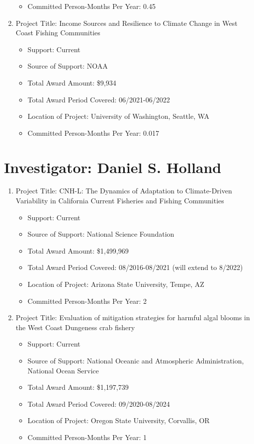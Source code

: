 \documentclass[12pt]{elsarticle}
\begin{document}
\begin{enumerate}
\begin{itemize}
\item Committed Person-Months Per Year: 0.45
\end{itemize}
\item Project Title: Income Sources and Resilience to Climate Change in West Coast Fishing Communities
\begin{itemize}
\item Support: Current
\item Source of Support: NOAA
\item Total Award Amount: \$9,934
\item Total Award Period Covered: 06/2021-06/2022
\item Location of Project: University of Washington, Seattle, WA
\item Committed Person-Months Per Year: 0.017
\end{itemize}
\end{enumerate}


\section*{Investigator: Daniel S. Holland}

\begin{enumerate}
\item Project Title:  CNH-L:  The Dynamics of Adaptation to Climate-Driven Variability in California Current Fisheries and Fishing Communities   
\begin{itemize}
\item Support: Current
\item Source of Support: National Science Foundation
\item Total Award Amount: \$1,499,969
\item Total Award Period Covered: 08/2016-08/2021 (will extend to 8/2022)
\item Location of Project: Arizona State University, Tempe, AZ
\item Committed Person-Months Per Year: 2
\end{itemize}
\item Project Title: Evaluation of mitigation strategies for harmful algal blooms in the West Coast Dungeness crab fishery
\begin{itemize}
\item Support: Current
\item Source of Support: National Oceanic and Atmospheric Administration, National Ocean Service
\item Total Award Amount: \$1,197,739
\item Total Award Period Covered: 09/2020-08/2024
\item Location of Project: Oregon State University, Corvallis, OR
\item Committed Person-Months Per Year: 1
\end{itemize}
\end{enumerate}
\end{document}
